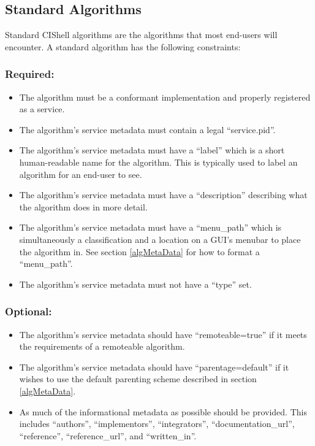 \subsection{Standard Algorithms}

Standard CIShell algorithms are the algorithms that most end-users will
encounter. A standard algorithm has the following constraints:

\subsubsection*{Required:}
\begin{itemize}
  \item The algorithm must be a conformant 
  implementation and properly registered as a service.
  \item The algorithm's service metadata must contain a legal ``service.pid''.
  \item The algorithm's service metadata must have a ``label'' which is a
  short human-readable name for the algorithm. This is typically used to label
  an algorithm for an end-user to see.
  \item The algorithm's service metadata must have a ``description''
  describing what the algorithm does in more detail.
  \item The algorithm's service metadata must have a ``menu\_path'' which is
  simultaneously a classification and a location on a GUI's menubar to place
  the algorithm in. See section \ref{algMetaData} for how to format a
  ``menu\_path''.
  \item The algorithm's service metadata must not have a ``type'' set.
\end{itemize}

\subsubsection*{Optional:}
\begin{itemize}
  \item The algorithm's service metadata should have ``remoteable=true'' if it
  meets the requirements of a remoteable algorithm.
  \item The algorithm's service metadata should have ``parentage=default'' if
  it wishes to use the default  parenting scheme described in
  section \ref{algMetaData}.
  \item As much of the informational metadata as possible should be
  provided. This includes ``authors'', ``implementors'', ``integrators'',
  ``documentation\_url'', ``reference'', ``reference\_url'', and ``written\_in''.
\end{itemize}


